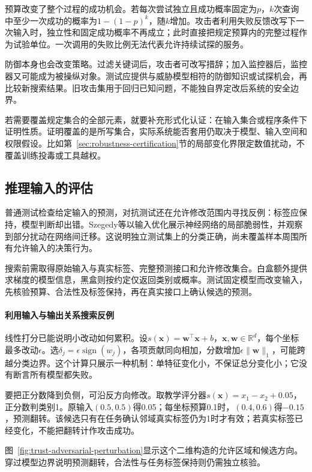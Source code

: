 预算改变了整个过程的成功机会。若每次尝试独立且成功概率固定为$p$，$k$次查询中至少一次成功的概率为$1-(1-p)^k$，随$k$增加。攻击者利用失败反馈改写下一次输入时，独立性和固定成功概率不再成立；此时直接把规定预算内的完整过程作为试验单位。一次调用的失败比例无法代表允许持续试探的服务。

防御本身也会改变策略。过滤关键词后，攻击者可改写措辞；加入监控器后，监控器又可能成为被操纵对象。测试应提供与威胁模型相符的防御知识或试探机会，再比较新搜索结果。旧攻击集用于回归已知问题，不能独自界定改后系统的安全边界。

若需要覆盖规定集合的全部元素，就要补充形式化认证：在输入集合或程序条件下证明性质。证明覆盖的是所写集合，实际系统能否套用仍取决于模型、输入空间和权限假设。比如第~\ref{sec:robustness-certification}节的局部变化界限定数值扰动，不覆盖训练投毒或工具越权。

\subsection{推理输入的评估}
\label{sec:security-prediction-test}

普通测试检查给定输入的预测，对抗测试还在允许修改范围内寻找反例：标签应保持，模型判断却出错。Szegedy等以输入优化展示神经网络的局部脆弱性，并观察到部分扰动在网络间迁移。这说明独立测试集上的分类正确，尚未覆盖样本周围所有允许输入的决策行为。

搜索前需取得原始输入与真实标签、完整预测接口和允许修改集合。白盒额外提供求梯度的模型信息，黑盒则按约定仅返回类别或概率。测试固定模型而改变输入，先核验预算、合法性及标签保持，再在真实接口上确认候选的预测。

\paragraph{利用输入与输出关系搜索反例}

线性打分已能说明小改动如何累积。设$s(\bm{x})=\bm{w}^{\top}\bm{x}+b$，$\bm{x},\bm{w}\in\mathbb R^d$，每个坐标最多改动$\epsilon$。选$\delta_j=\epsilon\operatorname{sign}(w_j)$，各项贡献同向相加，分数增加$\epsilon\|\bm{w}\|_1$，可能跨越分类边界。这个计算只展示一种机制：单特征变化小，不保证总分变化小；它没有断言所有模型都失败。

要把正分数降到负侧，可沿反方向修改。取教学评分器$s(\bm{x})=x_1-x_2+0.05$，正分数判类别1。原输入$(0.5,0.5)$得0.05；每坐标预算0.1时，$(0.4,0.6)$得$-0.15$，预测翻转。该候选只有在任务确认邻域真实标签仍为1时才有效；若真实标签已经变化，不能把翻转计作攻击成功。

图~\ref{fig:trust-adversarial-perturbation}显示这个二维构造的允许区域和候选方向。穿过模型边界说明预测翻转，合法性与任务标签保持则仍需独立核验。

